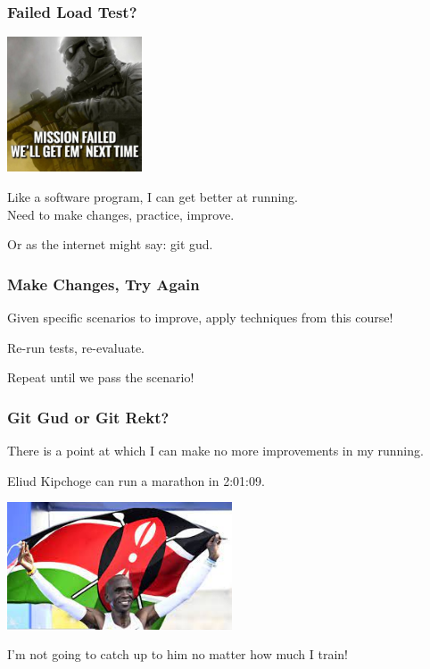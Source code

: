 \begin{frame}
\frametitle{Failed Load Test?}

\begin{center}
  \includegraphics[width=0.3\textwidth]{images/nexttime.png}
\end{center}

Like a software program, I can get better at running.\\
\quad Need to make changes, practice, improve.

Or as the internet might say: git gud.

\end{frame}

\begin{frame}
\frametitle{Make Changes, Try Again}

Given specific scenarios to improve, apply techniques from this course!

Re-run tests, re-evaluate.

Repeat until we pass the scenario!

\end{frame}

\begin{frame}
\frametitle{Git Gud or Git Rekt?}

There is a point at which I can make no more improvements in my running.

Eliud Kipchoge can run a marathon in 2:01:09.\\
\begin{center}
  \includegraphics[width=0.5\textwidth]{images/kipchoge.jpg}
\end{center}

I'm not going to catch up to him no matter how much I train!

\end{frame}

